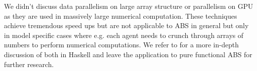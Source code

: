 We didn't discuss data parallelism on large array structure or parallelism on GPU as they are used in massively large numerical computation. These techniques achieve tremendous speed ups but are not applicable to ABS in general but only in model specific cases where e.g. each agent needs to crunch through arrays of numbers to perform numerical computations. We refer to \cite{marlow_parallel_2013} for a more in-depth discussion of both in Haskell and leave the application to pure functional ABS for further research.